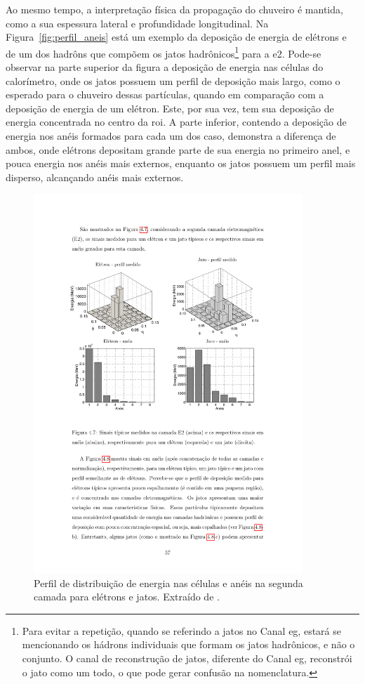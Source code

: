 Ao mesmo tempo, a interpretação física da propagação do
chuveiro é mantida, como a sua espessura lateral e profundidade longitudinal. 
Na Figura~\ref{fig:perfil_aneis} está um 
exemplo da deposição de energia de elétrons e de um dos hadrôns que
compõem os jatos hadrônicos\footnote{Para evitar a repetição, quando se
referindo a jatos no Canal \gls{eg}, estará se mencionando os hádrons individuais
que formam os jatos hadrônicos, e não o conjunto. O canal de reconstrução de
jatos, diferente do Canal \gls{eg}, reconstrói o jato como um todo, 
o que pode gerar confusão na nomenclatura.} para a \gls{e2}. Pode-se observar na parte
superior da figura a deposição de energia nas células do calorímetro, onde os
jatos possuem um perfil de deposição mais largo, como o esperado para o chuveiro
dessas partículas, quando em comparação com a deposição de energia de um
elétron. Este, por sua vez, tem sua deposição de energia concentrada no centro da
\gls{roi}. A parte inferior, contendo a deposição de energia nos anéis formados 
para cada um dos caso, demonstra a diferença de ambos, onde elétrons depositam grande parte de
sua energia no primeiro anel, e pouca energia nos anéis mais externos, enquanto
os jatos possuem um perfil mais disperso, alcançando anéis mais externos.

\begin{figure}[ht!]
\label{fig:perfil_segunda_camada}
\centering
\includegraphics[width=0.9\textwidth]{imagens/segunda_camada_celulas.pdf}
\caption[Perfil de distribuição de energia nas células e anéis na segunda camada para 
elétrons e jatos.]{Perfil de distribuição de energia nas células e anéis na segunda camada 
para elétrons e jatos. Extraído de \cite{tese_eduardo}.}
\end{figure}

